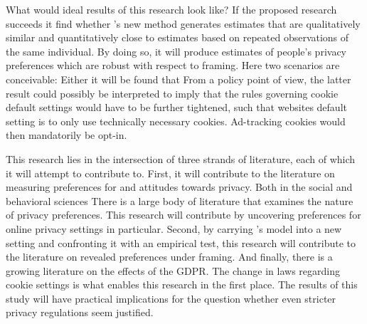 
What would ideal results of this research look like? If the proposed research succeeds it find whether \textcite{goldin2020}'s new method generates estimates that are 
qualitatively similar and quantitatively close to estimates based on repeated observations of the same individual.
By doing so, it will produce estimates of people's privacy preferences which are robust with respect to framing. Here two scenarios are conceivable: Either it will
be found that   From a policy point of view, the latter result could possibly be interpreted to imply that the rules governing cookie default settings would have to be
further tightened, such that websites default setting is to only use technically necessary cookies. Ad-tracking cookies would then mandatorily be opt-in.



This research lies in the intersection of three strands of literature, each of which it will attempt to contribute to. First, it will contribute to the 
literature on measuring preferences for and attitudes towards privacy. Both in the social and behavioral sciences There is a large body of literature that examines the 
nature of privacy preferences. This research will contribute by uncovering preferences for online privacy settings in particular. Second, by carrying \textcite{goldin2020}'s
model into a new setting and confronting it with an empirical test, this research will contribute to the literature on revealed preferences under framing.
And finally, there is a growing literature on the effects of the GDPR. The change in laws regarding cookie settings is what enables this research in the first place.
The results of this study will have practical implications for the question whether even stricter privacy regulations seem justified.














